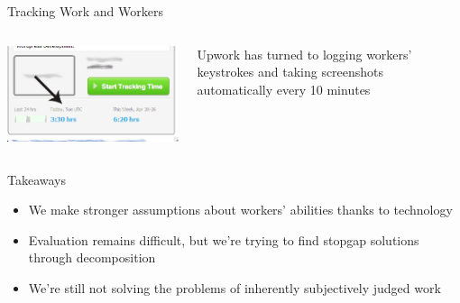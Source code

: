 \documentclass[presentation]{subfiles}
\begin{document}
\begin{frame}{Tracking Work and Workers} %
\begin{columns}
\begin{column}{.5\textwidth}
\includegraphics[max width=\textwidth,max height=.8\textheight,keepaspectratio]{../../../presentations/common_figures/screenshot_odeskteamapp.jpg}
\end{column}
\begin{column}{.5\textwidth}
  Upwork has turned to logging workers' keystrokes and taking screenshots automatically every 10 minutes
\end{column}
\end{columns}

\end{frame}

\begin{frame}{Takeaways}
  \begin{itemize}
    \item We make stronger assumptions about workers' abilities thanks to technology
    \item Evaluation remains difficult, but we're trying to find stopgap solutions through decomposition
    \item We're still not solving the problems of inherently subjectively judged work
  \end{itemize}
\end{frame}

\end{document}
